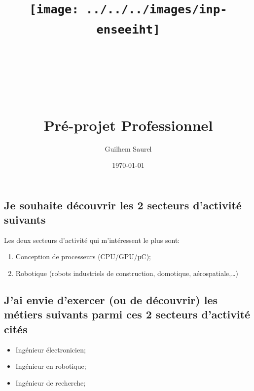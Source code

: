 \documentclass[10pt]{article}
\title{\texttt{[image: ../../../images/inp-enseeiht]} \\ ~ \\ ~ \\ ~ \\ ~ \\
Pré-projet Professionnel}
\author{Guilhem Saurel}
\date{\today}
\begin{document}
\begin{titlepage}
    \maketitle
    \tableofcontents
\end{titlepage}

\section{}
\subsection{Je souhaite découvrir les 2 secteurs d’activité suivants}
Les deux secteurs d’activité qui m’intéressent le plus sont:
\begin{enumerate}
    \item Conception de processeurs (CPU/GPU/µC);
    \item Robotique (robots industriels de construction, domotique, aérospatiale,…)
\end{enumerate}
\subsection{J’ai envie d’exercer (ou de découvrir) les métiers suivants parmi ces 2 secteurs d’activité cités}
\begin{itemize}
    \item Ingénieur électronicien;
    \item Ingénieur en robotique;
    \item Ingénieur de recherche;
\end{itemize}
\end{document}

